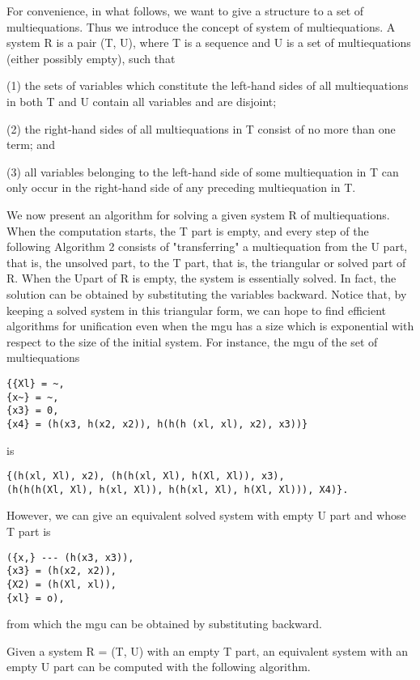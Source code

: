 
For convenience, in what follows, we want to give a structure to a set of
multiequations. Thus we introduce the concept of system of multiequations. A
system R is a pair (T, U), where T is a sequence and U is a set of multiequations
(either possibly empty), such that

(1) the sets of variables which constitute the left-hand sides of all multiequations
in both T and U contain all variables and are disjoint;

(2) the right-hand sides of all multiequations in T consist of no more than one
term; and

(3) all variables belonging to the left-hand side of some multiequation in T can
only occur in the right-hand side of any preceding multiequation in T. 

We now present an algorithm for solving a given system R of multiequations.
When the computation starts, the T part is empty, and every step of the following
Algorithm 2 consists of "transferring" a multiequation from the U part, that is,
the unsolved part, to the T part, that is, the triangular or solved part of R. When
the Upart of R is empty, the system is essentially solved. In fact, the solution can
be obtained by substituting the variables backward. Notice that, by keeping a
solved system in this triangular form, we can hope to find efficient algorithms for
unification even when the mgu has a size which is exponential with respect to the
size of the initial system. For instance, the mgu of the set of multiequations
\begin{verbatim} 
{{Xl} = ~,
{x~} = ~,
{x3} = 0,
{x4} = (h(x3, h(x2, x2)), h(h(h (xl, xl), x2), x3))} 
\end{verbatim}
is
\begin{verbatim}
{(h(xl, Xl), x2), (h(h(xl, Xl), h(Xl, Xl)), x3),
(h(h(h(Xl, Xl), h(xl, Xl)), h(h(xl, Xl), h(Xl, Xl))), X4)}. 
\end{verbatim} 
However, we can give an equivalent solved system with empty U part and whose
T part is
\begin{verbatim}
({x,} --- (h(x3, x3)),
{x3} = (h(x2, x2)),
{X2) = (h(Xl, xl)),
{xl} = o), 
\end{verbatim}
from which the mgu can be obtained by substituting backward. 

Given a system R = (T, U) with an empty T part, an equivalent system with
an empty U part can be computed with the following algorithm. 

